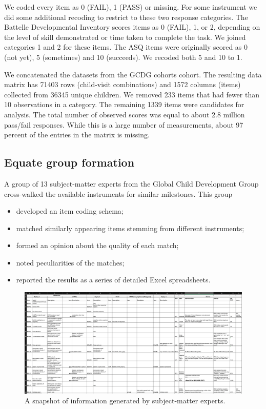 \documentclass[
]{book}
\providecommand{\tightlist}{%
  \setlength{\itemsep}{0pt}\setlength{\parskip}{0pt}}
\begin{document}
We coded every item as 0 (FAIL), 1 (PASS) or missing. For some instrument we did some additional recoding to restrict to these two response categories. The Battelle Developmental Inventory scores items as 0 (FAIL), 1, or 2, depending on the level of skill demonstrated or time taken to complete the task. We joined categories 1 and 2 for these items. The ASQ items were originally scored as 0 (not yet), 5 (sometimes) and 10 (succeeds). We recoded both 5 and 10 to 1.

We concatenated the datasets from the GCDG cohorts cohort. The resulting data matrix has 71403 rows (child-visit combinations) and 1572 columns (items) collected from 36345 unique children. We removed 233 items that had fewer than 10 observations in a category. The remaining 1339 items were candidates for analysis. The total number of observed scores was equal to about 2.8 million pass/fail responses. While this is a large number of measurements, about 97 percent of the entries in the matrix is missing.

\hypertarget{equate-group-formation}{%
\subsection{Equate group formation}\label{equate-group-formation}}

A group of 13 subject-matter experts from the Global Child Development Group cross-walked the available instruments for similar milestones. This group

\begin{itemize}
\tightlist
\item
  developed an item coding schema;
\item
  matched similarly appearing items stemming from different instruments;
\item
  formed an opinion about the quality of each match;
\item
  noted peculiarities of the matches;
\item
  reported the results as a series of detailed Excel spreadsheets.
\end{itemize}

\begin{figure}

{\centering \includegraphics[width=1\linewidth]{fig/equate_excel} 

}

\caption{A snapshot of information generated by subject-matter experts.}\label{fig:equatesheetpic}
\end{figure}
\end{document}
